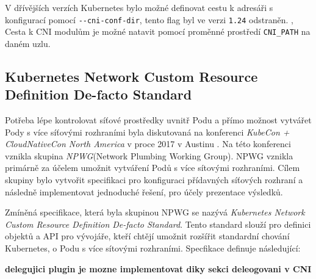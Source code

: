 V dřívějších verzích Kubernetes bylo možné definovat cestu k adresáři s konfigurací pomocí \verb|--cni-conf-dir|, tento flag byl ve verzi \verb|1.24| odstraněn. \cite{k8scirobot_2020_merge} , \cite{thekubernetesauthors_2022_networkPlugins} Cesta k CNI modulům je možné natavit pomocí proměnné prostředí \verb|CNI_PATH| na daném uzlu.

\subsection{Kubernetes Network Custom Resource Definition De-facto Standard}\label{sec:kncrdds}
Potřeba lépe kontrolovat síťové prostředky uvnitř Podu a přímo možnost vytvářet Pody s více síťovými rozhraními byla diskutovaná na konferenci \textit{KubeCon + CloudNativeCon North America} v proce 2017 v Austinu  \cite{woods_2018_a}. Na této konferenci vznikla skupina \textit{NPWG}(Network Plumbing Working Group). NPWG vznikla primárně za účelem umožnit vytváření Podů s více sítovými rozhraními. Cílem skupiny bylo vytvořit specifikaci pro konfiguraci přídavných síťových rozhraní a následně implementovat jednoduché řešení, pro účely prezentace výsledků.

Zmíněná specifikace, která byla skupinou NPWG se nazývá \textit{Kubernetes Network Custom Resource Definition De-facto Standard}. Tento standard slouží pro definici objektů a API pro vývojáře, kteří chtějí umožnit rozšířit standardní chování Kubernetes, o Podu s více sítovými rozhraními. Specfikace definuje následující:

\textbf{delegujici plugin je mozne implementovat diky sekci deleogovani v CNI}

